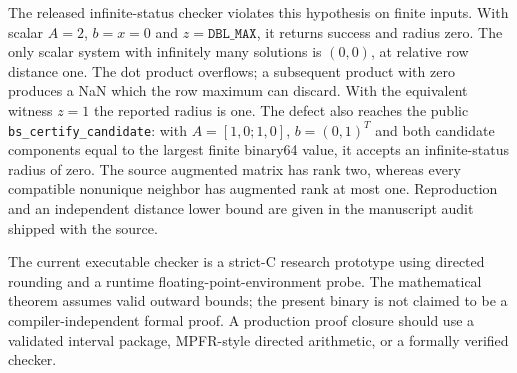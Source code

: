 \documentclass[11pt]{article}
\theoremstyle{definition}
\begin{document}
The released infinite-status checker violates this hypothesis on finite inputs. With scalar $A=2$, $b=x=0$ and $z=\texttt{DBL\_MAX}$, it returns success and radius zero. The only scalar system with infinitely many solutions is $(0,0)$, at relative row distance one. The dot product overflows; a subsequent product with zero produces a NaN which the row maximum can discard. With the equivalent witness $z=1$ the reported radius is one. The defect also reaches the public \texttt{bs\_certify\_candidate}: with $A=[1,0;1,0]$, $b=(0,1)^T$ and both candidate components equal to the largest finite binary64 value, it accepts an infinite-status radius of zero. The source augmented matrix has rank two, whereas every compatible nonunique neighbor has augmented rank at most one. Reproduction and an independent distance lower bound are given in the manuscript audit shipped with the source.

The current executable checker is a strict-C research prototype using directed rounding and a runtime floating-point-environment probe. The mathematical theorem assumes valid outward bounds; the present binary is not claimed to be a compiler-independent formal proof. A production proof closure should use a validated interval package, MPFR-style directed arithmetic, or a formally verified checker.
\end{document}
